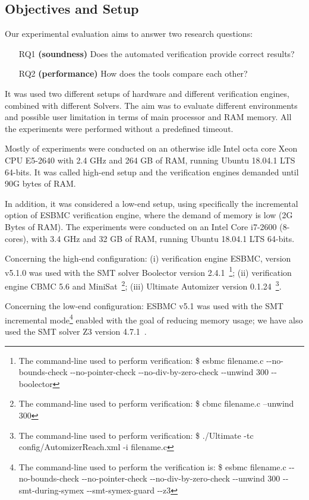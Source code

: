 \documentclass[runningheads]{llncs}
\begin{document}
\subsection{Objectives and Setup}
Our experimental evaluation aims to answer two research questions:
%
\begin{enumerate}
\item[RQ1] \textbf{(soundness)} Does the automated verification provide correct results?
\item[RQ2] \textbf{(performance)} How does the  tools compare each other?
\end{enumerate}

It was used two different setups of hardware and different verification engines, combined with different Solvers. The aim was to evaluate different environments and possible user limitation in terms of main processor and RAM memory. All the experiments were performed without a predefined timeout.

Mostly of experiments were conducted on an otherwise idle Intel octa core Xeon CPU E5-2640 with 2.4 GHz and 264 GB of RAM, running Ubuntu 18.04.1 LTS 64-bits. It was called high-end setup and the verification engines demanded until 90G bytes of RAM.

In addition, it was considered a low-end setup, using specifically the incremental option of ESBMC verification engine, where the demand of memory is low (2G Bytes of RAM). The experiments were conducted on an Intel Core i7-2600 (8-cores), with 3.4 GHz and 32 GB of RAM, running Ubuntu 18.04.1 LTS 64-bits. 

Concerning the high-end configuration: (i) verification engine ESBMC, version v5.1.0 was used with the SMT solver Boolector version 2.4.1~\cite{Brummayer}\footnote{The command-line used to perform verification: \$ esbmc filename.c -\phantom{}-no-bounds-check -\phantom{}-no-pointer-check -\phantom{}-no-div-by-zero-check -\phantom{}-unwind 300 -\phantom{}-boolector}; (ii) verification engine CBMC 5.6 and MiniSat~\cite{Kroening}\footnote{The command-line used to perform verification: \$ cbmc filename.c --unwind 300}; (iii) Ultimate Automizer version 0.1.24~\cite{Automizer2018}\footnote{The command-line used to perform verification: \$ ./Ultimate -tc config/AutomizerReach.xml -i filename.c}.
 
Concerning the low-end configuration: ESBMC v5.1 was used with the SMT incremental mode\footnote{The command-line used to perform the verification is: \$ esbmc filename.c -\phantom{}-no-bounds-check -\phantom{}-no-pointer-check -\phantom{}-no-div-by-zero-check -\phantom{}-unwind 300 -\phantom{}-smt-during-symex -\phantom{}-smt-symex-guard -\phantom{}-z3} enabled with the goal of reducing memory usage; we have also used the SMT solver Z3 version 4.7.1~\cite{DeMoura}. 
\end{document}
